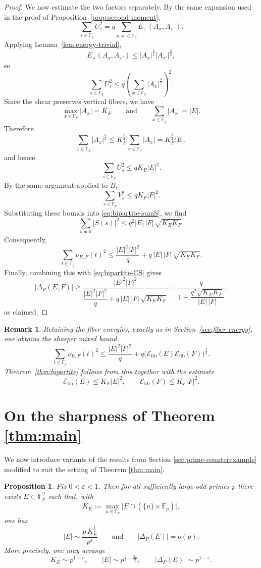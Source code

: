 \documentclass{article}
\newtheorem{proposition}[theorem]{Proposition}
\newtheorem{remark}[theorem]{Remark}
\newcommand{\F}{\mathbb{F}}
\newcommand{\abs}[1]{\left|#1\right|}
\newcommand{\1}{\mathbf{1}}
\begin{document}
\begin{proof}
We now estimate the two factors separately. By the same expansion used in the proof of
Proposition~\ref{prop:second-moment},
\[
\sum_{s\in\F_q}U_s^2
=
q\sum_{x,x'\in\F_q}E_+(A_x,A_{x'}).
\]
Applying Lemma~\ref{lem:energy-trivial},
\[
E_+(A_x,A_{x'})
\le
|A_x|^{\frac32}|A_{x'}|^{\frac32},
\]
so
\[
\sum_{s\in\F_q}U_s^2
\le
q\left(\sum_{x\in\F_q}|A_x|^{\frac32}\right)^2.
\]
Since the shear preserves vertical fibers, we have
\[
\max_{x\in\F_q}|A_x|=K_E
\qquad\text{and}\qquad
\sum_{x\in\F_q}|A_x|=|E|.
\]
Therefore
\[
\sum_{x\in\F_q}|A_x|^{\frac32}
\le
K_E^{\frac{1}{2}}\sum_{x\in\F_q}|A_x|
=
K_E^{\frac{1}{2}}|E|,
\]
and hence
\[
\sum_{s\in\F_q}U_s^2\le qK_E|E|^2.
\]
By the same argument applied to $B$,
\[
\sum_{s\in\F_q}V_s^2\le qK_F|F|^2.
\]
Substituting these bounds into \eqref{eq:bipartite-sumS}, we find
\[
\sum_{s\ne 0}|S(s)|^2
\le
q^2|E|\,|F|\,\sqrt{K_EK_F}.
\]
Consequently,
\[
\sum_{t\in\F_q}\nu_{E,F}(t)^2
\le
\frac{|E|^2|F|^2}{q}
+
q\,|E|\,|F|\,\sqrt{K_EK_F}.
\]
Finally, combining this with \eqref{eq:bipartite-CS} gives
\[
\abs{\Delta_P(E,F)}
\ge
\frac{|E|^2|F|^2}
{\dfrac{|E|^2|F|^2}{q}+q\,|E|\,|F|\,\sqrt{K_EK_F}}
=
\frac{q}{1+\dfrac{q^2\sqrt{K_EK_F}}{|E|\,|F|}},
\]
as claimed.
\end{proof}

\begin{remark}
Retaining the fiber energies, exactly as in Section~\ref{sec:fiber-energy}, one obtains the sharper mixed bound
\[
\sum_{t\in\F_q}\nu_{E,F}(t)^2
\le
\frac{|E|^2|F|^2}{q}
+
q\bigl(\mathcal{E}_{\mathrm{fib}}(E)\mathcal{E}_{\mathrm{fib}}(F)\bigr)^{\frac{1}{2}}.
\]
Theorem~\ref{thm:bipartite} follows from this together with the estimate
\[
\mathcal{E}_{\mathrm{fib}}(E)\le K_E|E|^2,
\qquad
\mathcal{E}_{\mathrm{fib}}(F)\le K_F|F|^2.
\]
\end{remark}



\section{On the sharpness of Theorem \ref{thm:main}}\label{section6}

We now introduce variants of the results from Section \ref{sec:prime-counterexample} modified to suit the setting of Theorem \ref{thm:main}.

\begin{proposition}
Fix \(0<\varepsilon<1\). Then for all sufficiently large odd primes \(p\) there exists
\(E\subset \F_p^2\) such that, with
\[
K_E:=\max_{u\in\F_p}\bigl|E\cap (\{u\}\times \F_p)\bigr|,
\]
one has
\[
|E|\sim \frac{p\,K_E^{\frac{1}{2}}}{p^\varepsilon}
\qquad\text{and}\qquad
|\Delta_P(E)|=o(p).
\]
More precisely, one may arrange
\[
K_E\sim p^{1-\varepsilon},\qquad
|E|\sim p^{\frac32-\frac{3\varepsilon}{2}},\qquad
|\Delta_P(E)|\sim p^{1-\varepsilon}.
\]
\end{proposition}
\end{document}
